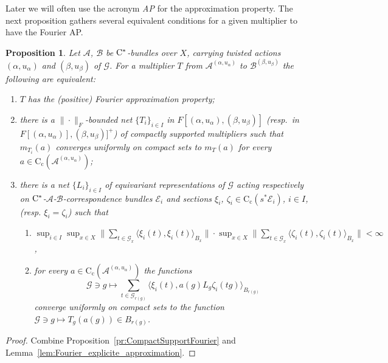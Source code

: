 \documentclass[11 pt, leqno]{amsart}
\numberwithin{equation}{section}
\theoremstyle{plain}
\newtheorem {prop}[thm] {Proposition}
\theoremstyle{definition}
\newcommand*{\contc}{\mathrm{C_c}}%
\newcommand{\B}{\mathcal B}
\newcommand{\m}{m}
\newcommand{\G}{\mathcal G} %
\newcommand{\EE}{\mathcal E}
\newcommand{\A}{\mathcal A}
\newcommand{\cst}{\ifmmode\mathrm{C}^*\else{$\mathrm{C}^*$}\fi}
\begin{document}
Later we will often use the acronym \emph{AP} for the approximation property. 
The next proposition gathers several equivalent conditions for a given multiplier to have the Fourier AP. 

\begin{prop}\label{prop:characterisation_Fourier_approx}
Let $\A$, $\B$ be $\cst$-bundles over $X$, carrying twisted actions $(\alpha,u_\alpha)$ and $(\beta,u_\beta)$ of $\G$. 
For a multiplier $T$ from $\A^{(\alpha,u_{\alpha})}$ to $\B^{(\beta,u_{\beta})}$ the following are equivalent:
\begin{enumerate}
    \item\label{enu:characterisation_Fourier_approx1} $T$ has the (positive) Fourier approximation property;  
    \item\label{enu:characterisation_Fourier_approx2} there is a  $\|\cdot\|_{F}$-bounded net $\{T_{i}\}_{i\in I}$ in $ F[(\alpha,u_{\alpha}),(\beta,u_{\beta})]$ (resp.\ in $ F[(\alpha,u_{\alpha})],(\beta,u_{\beta})]^+$) of compactly supported  multipliers such that $\m_{T_i}(a)$ converges  uniformly on compact sets to $\m_{T}(a)$ for every $a\in\contc(\A^{(\alpha,u_{\alpha})})$; 
    \item\label{enu:characterisation_Fourier_approx3} there is a net $\{L_i\}_{i \in I}$ of equivariant representations of $\G$ acting respectively on $\cst$-$\A$-$\B$-correspondence bundles $\EE_i$ and sections $\xi_i$, $\zeta_i\in \contc(s^*\EE_i)$, $i\in I$, (resp. $\xi_i=\zeta_i$) such that 
    \begin{enumerate}
        \item $\sup_{i\in I}\sup_{x\in X}\|\sum_{t\in \G_{x}} \langle \xi_i(t), \xi_i(t)\rangle_{B_x}\| \cdot \sup_{x\in X}\|\sum_{t\in \G_{x}} \langle \zeta_i(t), \zeta_i(t)\rangle_{B_x}\|<\infty$,
        \item for every $a\in\contc(\A^{(\alpha,u_{\alpha})})$ the functions 
        \[
            \G\ni g\longmapsto \sum_{t\in \G_{r(g)}}\langle \xi_i(t), a(g)L_{g} \zeta_i(tg)\rangle_{B_{r(g)}}
        \]
        converge uniformly on compact sets to the function $\G\ni g\longmapsto T_{g}(a(g))\in B_{r(g)}$.
    \end{enumerate}
\end{enumerate}
\end{prop}
\begin{proof}
Combine Proposition~\ref{pr:CompactSupportFourier} and Lemma~\ref{lem:Fourier_explicite_approximation}.
\end{proof}
\end{document}

